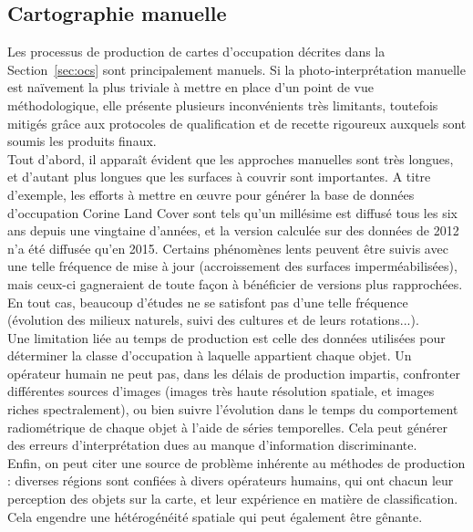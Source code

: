\subsection{Cartographie manuelle}
\label{ssec:ocs_manuelle}
Les processus de production de cartes d'occupation décrites dans la Section~\ref{sec:ocs} sont principalement manuels. Si la photo-interprétation manuelle est naïvement la plus triviale à mettre en place d'un point de vue méthodologique, elle présente plusieurs inconvénients très limitants, toutefois mitigés grâce aux protocoles de qualification et de recette rigoureux auxquels sont soumis les produits finaux.\\
Tout d'abord, il apparaît évident que les approches manuelles sont très longues, et d'autant plus longues que les surfaces à couvrir sont importantes. A titre d'exemple, les efforts à mettre en \oe{}uvre pour générer la base de données d'occupation Corine Land Cover sont tels qu'un millésime est diffusé tous les six ans depuis une vingtaine d'années, et la version calculée sur des données de 2012 n'a été diffusée qu'en 2015. Certains phénomènes lents peuvent être suivis avec une telle fréquence de mise à jour (accroissement des surfaces imperméabilisées), mais ceux-ci gagneraient de toute façon à bénéficier de versions plus rapprochées. En tout cas, beaucoup d'études ne se satisfont pas d'une telle fréquence (évolution des milieux naturels, suivi des cultures et de leurs rotations...).\\
Une limitation liée au temps de production est celle des données utilisées pour déterminer la classe d'occupation à laquelle appartient chaque objet. Un opérateur humain ne peut pas, dans les délais de production impartis, confronter différentes sources d'images (images très haute résolution spatiale, et images riches spectralement), ou bien suivre l'évolution dans le temps du comportement radiométrique de chaque objet à l'aide de séries temporelles. Cela peut générer des erreurs d'interprétation dues au manque d'information discriminante.\\
Enfin, on peut citer une source de problème inhérente au méthodes de production : diverses régions sont confiées à divers opérateurs humains, qui ont chacun leur perception des objets sur la carte, et leur expérience en matière de classification. Cela engendre une hétérogénéité spatiale qui peut également être gênante.

